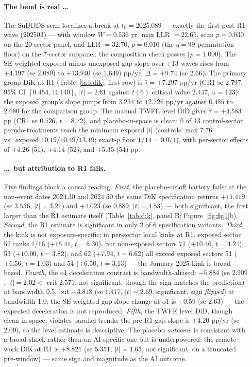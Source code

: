 \documentclass[11pt]{article}
\begin{document}
\paragraph{The bend is real \ldots} The SuDDDS scan localizes a break at
$t_0=2025.089$ --- exactly the first post-R1 wave (202503) --- with window
$W=0.536$ yr: max LLR $=22.65$, scan $p=0.030$ on the 20-sector panel, and LLR
$=32.70$, $p=0.010$ (the $q=99$ permutation floor) on the 7-sector subpanel;
the composition check passes ($p=1.000$). The SE-weighted exposed-minus-unexposed
gap slope over $\pm 13$ waves rises from $+4.197$ (se $2.089$) to $+13.940$
(se $1.649$) pp/yr, $\Delta = +9.74$ (se $2.66$). The primary group DiK at R1
(Table~\ref{tab:dik}, first row) is $\hat\tau = +7.297$ pp/yr (CR1 se $2.797$,
95\% CI $[0.454, 14.140]$, $|t|=2.61$ against $t(6)$ critical value $2.447$,
$n=123$): the exposed group's slope jumps from $3.234$ to $12.726$ pp/yr against
$0.485$ to $2.680$ for the comparison group. The manual TWFE level DiD gives
$\hat\tau = +4.583$ pp (CR1 se $0.526$, $t=8.72$), and placebo-in-space is
clean: 0 of 13 control-sector pseudo-treatments reach the minimum exposed
$|t|$ (controls' max $7.76$ vs.\ exposed $10.19/10.49/13.19$; exact-$p$ floor
$1/14 = 0.071$), with per-sector effects of $+4.26$ (51), $+4.14$ (52), and
$+5.35$ (54) pp.

\paragraph{\ldots\ but attribution to R1 fails.} Five findings block a causal
reading. \emph{First}, the placebo-cutoff battery fails: at the non-event dates
2024.30 and 2024.50 the same DiK specification returns $+11.419$ (se $3.556$,
$|t|=3.21$) and $+4.023$ (se $0.889$, $|t|=4.53$) --- both significant, the
first larger than the R1 estimate itself (Table~\ref{tab:dik}, panel B;
Figure~\ref{fig:fig1}b). \emph{Second}, the R1 estimate is significant in only
2 of 6 specification variants. \emph{Third}, the kink is not
exposure-specific: in per-sector local kinks at R1, exposed sector 52 ranks
1/16 ($+15.41$, $t=6.36$), but non-exposed sectors 71 ($+10.46$, $t=4.24$), 53
($+10.00$, $t=3.82$), and 62 ($+7.94$, $t=6.62$) all exceed exposed sectors 51
($+6.56$, $t=1.03$) and 54 ($+6.50$, $t=3.13$) --- the January-2025 kink is
broad-based. \emph{Fourth}, the o1 deceleration contrast is bandwidth-aliased:
$-5.884$ (se $2.909$, $|t|=2.02 <$ crit $2.571$, not significant, though the
sign matches the prediction) at bandwidth 0.5, but $+3.818$ (se $1.417$,
$|t|=2.69$, significant, sign \emph{flipped}) at bandwidth 1.0; the SE-weighted
gap-slope change at o1 is $+0.59$ (se $2.63$) --- the expected deceleration is
not reproduced. \emph{Fifth}, the TWFE level DiD, though clean in space,
violates parallel trends: the pre-R1 gap slope is $+4.20$ pp/yr (se $2.09$), so
the level estimate is descriptive. The placebo \emph{outcome} is consistent
with a broad shock rather than an AI-specific one but is underpowered: the
remote-work DiK at R1 is $+8.821$ (se $5.351$, $|t|=1.65$, not significant, on
a truncated pre-window) --- same sign and magnitude as the AI outcome.
\end{document}
